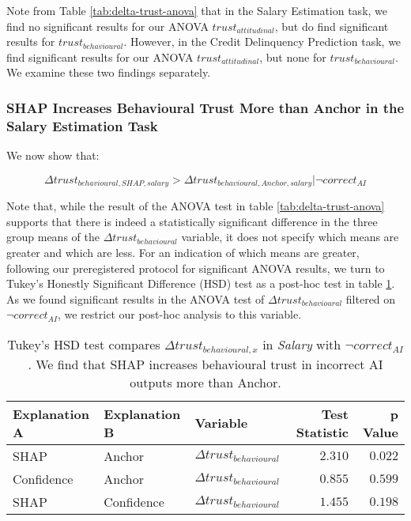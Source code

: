 Note from Table \ref{tab:delta-trust-anova} that in the Salary Estimation task, we find no significant results for our ANOVA $trust_{attitudinal}$, but do find significant results for $trust_{behavioural}$. However, in the Credit Delinquency Prediction task, we find significant results for our ANOVA $trust_{attitudinal}$, but none for $trust_{behavioural}$. We examine these two findings separately.

\subsubsection{SHAP Increases Behavioural Trust More than Anchor in the Salary Estimation Task}
We now show that:

\begin{equation}
    \Delta trust_{behavioural,SHAP,salary} > \Delta trust_{behavioural,Anchor,salary} | \neg correct_{AI}
\end{equation}

\noindent Note that, while the result of the ANOVA test in table \ref{tab:delta-trust-anova} supports that there is indeed a statistically significant difference in the three group means of the $\Delta trust_{behavioural}$ variable, it does not specify which means are greater and which are less. For an indication of which means are greater, following our preregistered protocol for significant ANOVA results, we turn to Tukey's Honestly Significant Difference (HSD) test as a post-hoc test in table \ref{tab:delta-trust-hsd}. As we found significant results in the ANOVA test of $\Delta trust_{behavioural}$ filtered on $\neg correct_{AI}$, we restrict our post-hoc analysis to this variable.

\begin{table}[htb]
    \centering
    \caption{Tukey's HSD test compares $\Delta trust_{behavioural,x}$ in \emph{Salary} with $\neg correct_{AI}$. We find that SHAP increases behavioural trust in incorrect AI outputs more than Anchor.}
    \label{tab:delta-trust-hsd}
    \begin{tabular}{lllrr}
        \toprule
        Explanation A & Explanation B & Variable & Test Statistic & p Value \\
        \midrule
        SHAP & Anchor & $\Delta trust_{behavioural}$ & $\mathbf{2.310}$ & $\mathbf{0.022}$ \\
        Confidence & Anchor & $\Delta trust_{behavioural}$ & $0.855$ & $0.599$ \\
        SHAP & Confidence & $\Delta trust_{behavioural}$ & $1.455$ & $0.198$ \\
        \bottomrule
    \end{tabular}
\end{table}

